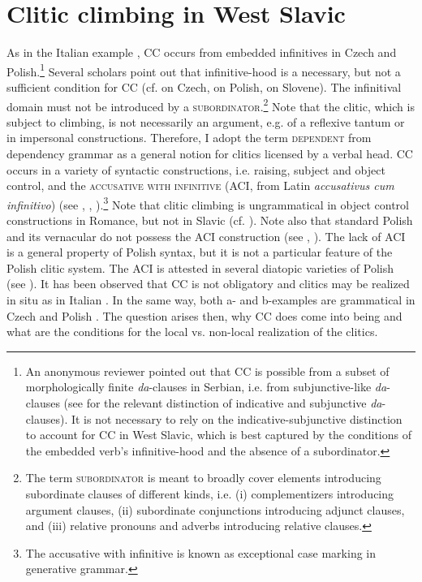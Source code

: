 \documentclass[output=paper,colorlinks,citecolor=brown]{langscibook}
\begin{document}
\section{Clitic climbing in West Slavic}\label{kul:sec:climbing-westslav}

As in the Italian example , CC occurs from embedded infinitives in Czech and Polish.\footnote{An anonymous reviewer pointed out that CC is possible from a subset of morphologically finite \textit{da}-clauses in Serbian, i.e. from subjunctive-like \textit{da}-clauses (see \citealt{Progovac1993, Progovac1996} for the relevant distinction of indicative and subjunctive \textit{da}-clauses). It is not necessary to rely on the indicative-subjunctive distinction to account for CC in West Slavic, which is best captured by the conditions of the embedded verb’s infinitive-hood and the absence of a subordinator.} Several scholars point out that infinitive-hood is a necessary, but not a sufficient condition for CC (cf. \citealt[69]{Junghanns2002a} on Czech, \citealt[58]{Kupsc2000} on Polish, \citealt[221--222]{Golden2003} on Slovene). The infinitival domain must not be introduced by a \textsc{subordinator}.\footnote{The term \textsc{subordinator} is meant to broadly cover elements introducing subordinate clauses of different kinds, i.e. (i) complementizers introducing argument clauses, (ii) subordinate conjunctions introducing adjunct clauses, and (iii) relative pronouns and adverbs introducing relative clauses.}  Note that the clitic, which is subject to climbing, is not necessarily an argument, e.g. {\REFL} of a reflexive tantum or in impersonal constructions. Therefore, I adopt the term \textsc{dependent} from dependency grammar as a general notion for clitics licensed by a verbal head. CC occurs in a variety of syntactic constructions, i.e. raising, subject and object control, and the \textsc{accusative with infinitive} (ACI, from Latin \textit{accusativus cum infinitivo}) (see \citealt{Junghanns2002a}, \citealt{Golden2008}, \citealt{Kupsc2000}).\footnote{The accusative with infinitive is known as exceptional case marking in generative grammar.} Note that clitic climbing is ungrammatical in object control constructions in Romance, but not in Slavic (cf. 
\citealt[315]{Golden2008}). Note also that standard Polish and its vernacular do not possess the ACI construction (see \citealt[33]{PrzepiórkowskiRosen2005}, \citealt[96]{Kupsc2000}). The lack of ACI is a general property of Polish syntax, but it is not a particular feature of the Polish clitic system. The ACI is attested in several diatopic varieties of Polish (see \citealt[56]{Urbanczyk1976}). It has been observed that CC is not obligatory and clitics may be realized in situ as in Italian . In the same way, both a- and b-examples are grammatical in Czech  and Polish . The question arises then, why CC does come into being and what are the conditions for the local vs. non-local realization of the clitics.
\end{document}
